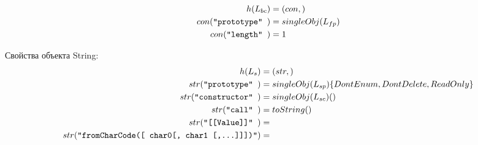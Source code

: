 \[
\begin{aligned}
  h(L_{bc})  &= (con, ) \\ 
  con( \mbox{\texttt{``prototype''   }})   &= singleObj( L_{fp} ) \\
  con( \mbox{\texttt{``length''   }})   &= 1 \\
\end{aligned}
\]

Свойства объекта String:
\[
\begin{aligned}
  h(L_{s})  &= (str, ) \\ 
  str( \mbox{\texttt{``prototype''   }})   &= singleObj( L_{sp} ) \{DontEnum, DontDelete, ReadOnly \} \\
  str( \mbox{\texttt{``constructor'' }})   &= singleObj( L_{sc} )() \\
  str( \mbox{\texttt{``call'' }})	   &= toString() \\
  str( \mbox{\texttt{``[[Value]]'' }})	   &= \\
  str( \mbox{\texttt{``fromCharCode([ char0[, char1 [,...]]])''}}) &= \\
\end{aligned}
\]

